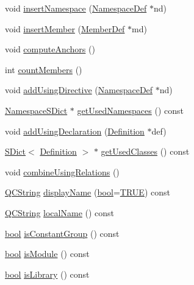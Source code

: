 \begin{DoxyCompactItemize}
\item 
void \hyperlink{class_namespace_def_ad8541e3f12703c4d15d452d517f766f5}{insert\+Namespace} (\hyperlink{class_namespace_def}{Namespace\+Def} $\ast$nd)
\item 
void \hyperlink{class_namespace_def_a38f5aa9ebc5f6f6bf2b7b74b920644c0}{insert\+Member} (\hyperlink{class_member_def}{Member\+Def} $\ast$md)
\item 
void \hyperlink{class_namespace_def_ae084faa2e838df796c83edb5ed91ccdf}{compute\+Anchors} ()
\item 
int \hyperlink{class_namespace_def_a519a9d379318446771b10218b0a5815f}{count\+Members} ()
\item 
void \hyperlink{class_namespace_def_aa498560251ece9f53560fa01969a2577}{add\+Using\+Directive} (\hyperlink{class_namespace_def}{Namespace\+Def} $\ast$nd)
\item 
\hyperlink{class_namespace_s_dict}{Namespace\+S\+Dict} $\ast$ \hyperlink{class_namespace_def_ab56c9c640d176ace38e9d9c26bad35c5}{get\+Used\+Namespaces} () const 
\item 
void \hyperlink{class_namespace_def_af1db7a8a28a023036b23c56126cf718b}{add\+Using\+Declaration} (\hyperlink{class_definition}{Definition} $\ast$def)
\item 
\hyperlink{class_s_dict}{S\+Dict}$<$ \hyperlink{class_definition}{Definition} $>$ $\ast$ \hyperlink{class_namespace_def_aeb5ebebdb6eb0fae08d4f47af3d7952a}{get\+Used\+Classes} () const 
\item 
void \hyperlink{class_namespace_def_a3dcd4b6bac35e19712eac238f9f6b392}{combine\+Using\+Relations} ()
\item 
\hyperlink{class_q_c_string}{Q\+C\+String} \hyperlink{class_namespace_def_a73aea0ba8bfb92ae1e7876a2e9a9520a}{display\+Name} (\hyperlink{qglobal_8h_a1062901a7428fdd9c7f180f5e01ea056}{bool}=\hyperlink{qglobal_8h_a04a6422a52070f0dc478693da640242b}{T\+R\+U\+E}) const 
\item 
\hyperlink{class_q_c_string}{Q\+C\+String} \hyperlink{class_namespace_def_ab74836639c50e150a6aaf629514cf734}{local\+Name} () const 
\item 
\hyperlink{qglobal_8h_a1062901a7428fdd9c7f180f5e01ea056}{bool} \hyperlink{class_namespace_def_aa48b0dfb64ab2451cc7a08a6491e425b}{is\+Constant\+Group} () const 
\item 
\hyperlink{qglobal_8h_a1062901a7428fdd9c7f180f5e01ea056}{bool} \hyperlink{class_namespace_def_a7e90f231ce98501513c36926e4fe16ff}{is\+Module} () const 
\item 
\hyperlink{qglobal_8h_a1062901a7428fdd9c7f180f5e01ea056}{bool} \hyperlink{class_namespace_def_adedce6e24c1972f4de3717b593f8abed}{is\+Library} () const 

\end{DoxyCompactItemize}
